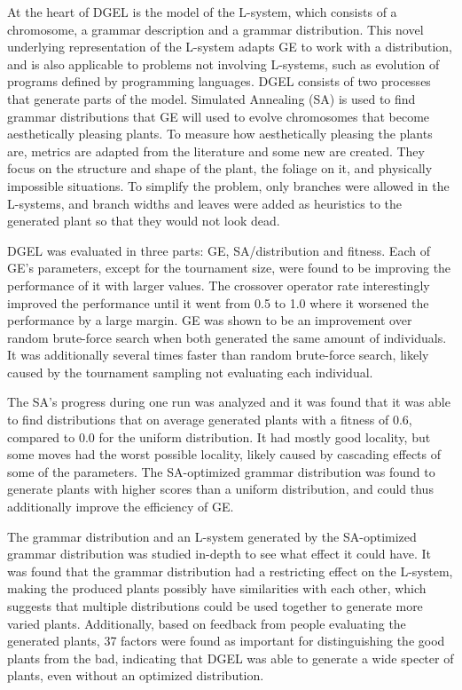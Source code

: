 At the heart of DGEL is the model of the L-system, which consists of a chromosome, a grammar description and a grammar distribution.
This novel underlying representation of the L-system adapts GE to work with a distribution, and is also applicable to problems not involving L-systems, such as evolution of programs defined by programming languages.
DGEL consists of two processes that generate parts of the model.
Simulated Annealing (SA) is used to find grammar distributions that GE will used to evolve chromosomes that become aesthetically pleasing plants.
To measure how aesthetically pleasing the plants are, metrics are adapted from the literature and some new are created.
They focus on the structure and shape of the plant, the foliage on it, and physically impossible situations.
To simplify the problem, only branches were allowed in the L-systems, and branch widths and leaves were added as heuristics to the generated plant so that they would not look dead.

DGEL was evaluated in three parts: GE, SA/distribution and fitness.
Each of GE's parameters, except for the tournament size, were found to be improving the performance of it with larger values.
The crossover operator rate interestingly improved the performance until it went from 0.5 to 1.0 where it worsened the performance by a large margin.
GE was shown to be an improvement over random brute-force search when both generated the same amount of individuals.
It was additionally several times faster than random brute-force search, likely caused by the tournament sampling not evaluating each individual.

The SA's progress during one run was analyzed and it was found that it was able to find distributions that on average generated plants with a fitness of 0.6, compared to 0.0 for the uniform distribution.
It had mostly good locality, but some moves had the worst possible locality, likely caused by cascading effects of some of the parameters.
The SA-optimized grammar distribution was found to generate plants with higher scores than a uniform distribution, and could thus additionally improve the efficiency of GE.

The grammar distribution and an L-system generated by the SA-optimized grammar distribution was studied in-depth to see what effect it could have.
It was found that the grammar distribution had a restricting effect on the L-system, making the produced plants possibly have similarities with each other, which suggests that multiple distributions could be used together to generate more varied plants.
Additionally, based on feedback from people evaluating the generated plants, 37 factors were found as important for distinguishing the good plants from the bad, indicating that DGEL was able to generate a wide specter of plants, even without an optimized distribution.

